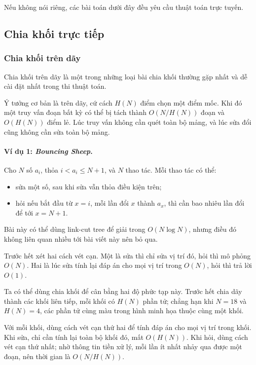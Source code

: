 \documentclass[11pt]{article}
\begin{document}
Nếu không nói riêng, các bài toán dưới đây đều yêu cầu thuật toán trực tuyến.

\subsection{Chia khối trực tiếp}

\subsubsection{Chia khối trên dãy}

Chia khối trên dãy là một trong những loại bài chia khối thường gặp nhất và dễ
cài đặt nhất trong thi thuật toán.

Ý tưởng cơ bản là trên dãy, cứ cách \(H(N)\) điểm chọn một điểm mốc. Khi đó một
truy vấn đoạn bất kỳ có thể bị tách thành \(O(N/H(N))\) đoạn và \(O(H(N))\)
điểm lẻ. Lúc truy vấn không cần quét toàn bộ mảng, và lúc sửa đổi cũng không
cần sửa toàn bộ mảng.

\paragraph{Ví dụ 1: \emph{Bouncing Sheep}.}
Cho \(N\) số \(a_i\), thỏa \(i<a_i\le N+1\), và \(N\) thao tác. Mỗi thao tác có
thể:
\begin{itemize}
  \item sửa một số, sau khi sửa vẫn thỏa điều kiện trên;
  \item hỏi nếu bắt đầu từ \(x=i\), mỗi lần đổi \(x\) thành \(a_x\), thì cần bao
  nhiêu lần đổi để tới \(x=N+1\).
\end{itemize}

Bài này có thể dùng link-cut tree để giải trong \(O(N\log N)\), nhưng điều đó
không liên quan nhiều tới bài viết này nên bỏ qua.

Trước hết xét hai cách vét cạn. Một là sửa thì chỉ sửa vị trí đó, hỏi thì mô
phỏng \(O(N)\). Hai là lúc sửa tính lại đáp án cho mọi vị trí trong \(O(N)\),
hỏi thì trả lời \(O(1)\).

Ta có thể dùng chia khối để cân bằng hai độ phức tạp này. Trước hết chia dãy
thành các khối liên tiếp, mỗi khối có \(H(N)\) phần tử; chẳng hạn khi \(N=18\)
và \(H(N)=4\), các phần tử cùng màu trong hình minh họa thuộc cùng một khối.

Với mỗi khối, dùng cách vét cạn thứ hai để tính đáp án cho mọi vị trí trong
khối. Khi sửa, chỉ cần tính lại toàn bộ khối đó, mất \(O(H(N))\). Khi hỏi, dùng
cách vét cạn thứ nhất; nhờ thông tin tiền xử lý, mỗi lần ít nhất nhảy qua được
một đoạn, nên thời gian là \(O(N/H(N))\).
\end{document}
